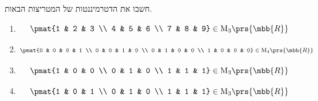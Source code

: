 \documentclass[a4paper,10pt,twoside,openany]{book}
\renewcommand{\Mat}{\mathrm{M}}
\begin{document}
\begin{exercisechap}
חשבו את הדטרמיננטות של המטריצות הבאות.

\begin{enumerate}
\item \[\pmat{1 & 2 & 3 \\ 4 & 5 & 6 \\ 7 & 8 & 9} \in \Mat_{3}\prs{\mbb{R}}\]
\item \[\pmat{0 & 0 & 0 & 1 \\ 0 & 0 & 1 & 0 \\ 0 & 1 & 0 & 0 \\ 1 & 0 & 0 & 0} \in \Mat_{4}\prs{\mbb{R}}\]
\item \[\pmat{1 & 0 & 0 \\ 0 & 1 & 0 \\ 1 & 1 & 1} \in \Mat_{3}\prs{\mbb{R}}\]
\item \[\pmat{1 & 0 & 1 \\ 0 & 1 & 0 \\ 1 & 1 & 1} \in \Mat_{3}\prs{\mbb{R}}\]
\end{enumerate}
\end{exercisechap}
\end{document}
